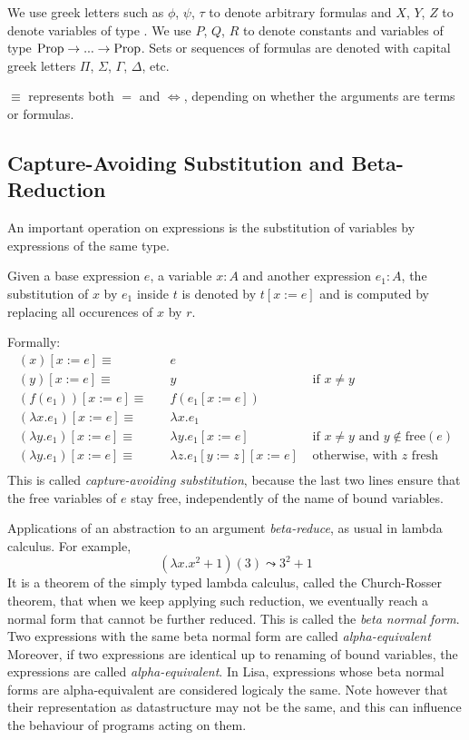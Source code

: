 We use greek letters such as $\phi$, $\psi$, $\tau$ to denote arbitrary formulas and $X$, $Y$, $Z$ to denote variables of type \Prop. We use $P$, $Q$, $R$ to denote constants and variables of type $\text{Prop} \rightarrow ... \rightarrow \text{Prop}$. Sets or sequences of formulas are denoted with capital greek letters $\Pi$, $\Sigma$, $\Gamma$, $\Delta$, etc.

$\equiv$ represents both $=$ and $\iff$, depending on whether the arguments are terms or formulas.

\subsection{Capture-Avoiding Substitution and Beta-Reduction}
An important operation on expressions is the substitution of variables by expressions of the same type.
\begin{definition}
  Given a base expression $e$, a variable $x: A$ and another expression $e_1:A$, the substitution of $x$ by $e_1$ inside $t$ is denoted by $ t[x := e] $ and is computed by replacing all occurences of $x$ by $r$.

  Formally:
  \begin{align*}
    (x)[x := e] \equiv\quad& e & \\
    (y)[x := e] \equiv\quad& y & \text{ if } x \neq y \\
    (f(e_1))[x := e] \equiv\quad& f(e_1[x := e]) & \\
    (\lambda x. e_1)[x := e] \equiv\quad& \lambda x. e_1 & \\
    (\lambda y. e_1)[x := e] \equiv\quad& \lambda y. e_1[x := e] &\text{ if } x \neq y \text{ and } y \notin \text{free}(e) \\
    (\lambda y. e_1)[x := e] \equiv\quad& \lambda z. e_1[y := z][x := e] &\text{ otherwise, with $z$ fresh} \\
  \end{align*}
  This is called \textit{capture-avoiding substitution}, because the last two lines ensure that the free variables of $e$ stay free, independently of the name of bound variables.
\end{definition}

Applications of an abstraction to an argument \textit{beta-reduce}, as usual in lambda calculus. For example,
$$(\lambda x. x^2+1)(3) \leadsto 3^2+1$$
It is a theorem of the simply typed lambda calculus, called the Church-Rosser theorem, that when we keep applying such reduction, we eventually reach a normal form that cannot be further reduced. This is called the \textit{beta normal form}. Two expressions with the same beta normal form are called \textit{alpha-equivalent} Moreover, if two expressions are identical up to renaming of bound variables, the expressions are  called \textit{alpha-equivalent}. In Lisa, expressions whose beta normal forms are alpha-equivalent are considered logicaly the same. Note however that their representation as datastructure may not be the same, and this can influence the behaviour of programs acting on them.

